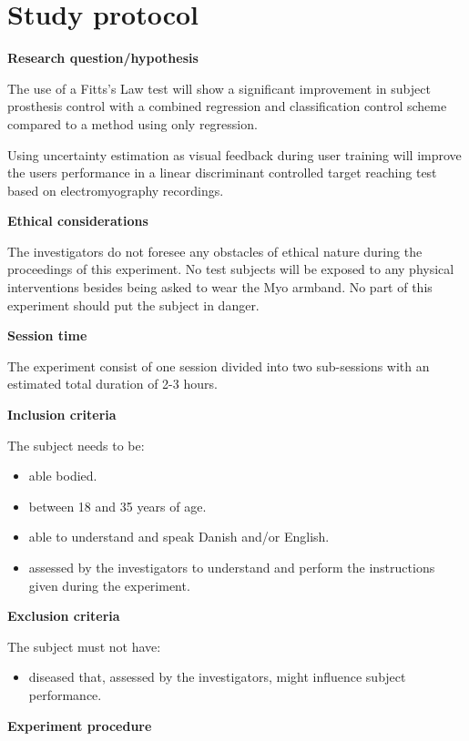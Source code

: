 \section{Study protocol}

\textbf{Research question/hypothesis}

The use of a Fitts’s Law test will show a significant improvement in subject prosthesis control with a combined regression and classification control scheme compared to a method using only regression. 

Using uncertainty estimation as visual feedback during user training will improve the users performance in a linear discriminant controlled target reaching test based on electromyography recordings.

\textbf{Ethical considerations}  

The investigators do not foresee any obstacles of ethical nature during the proceedings of this experiment. No test subjects will be exposed to any physical interventions besides being asked to wear the Myo armband. No part of this experiment should put the subject in danger. 

\textbf{Session time} 

The experiment consist of one session divided into two sub-sessions with an estimated total duration of 2-3 hours.

\textbf{Inclusion criteria}

The subject needs to be:
\begin{itemize}
	\item able bodied.
	\item between 18 and 35 years of age.
	\item able to understand and speak Danish and/or English.
	\item assessed by the investigators to understand and perform the instructions given during the experiment. 
\end{itemize}


\textbf{Exclusion criteria}

The subject must not have:
\begin{itemize}
	\item diseased that, assessed by the investigators, might influence subject performance.
\end{itemize}


\textbf{Experiment procedure}

